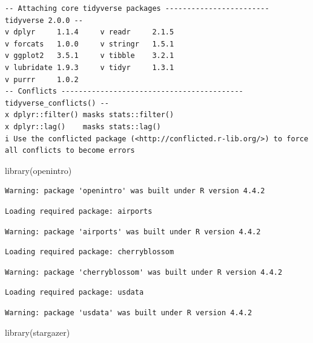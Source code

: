 \documentclass[
  letterpaper,
]{book}
\newenvironment{Shaded}{\begin{snugshade}}{\end{snugshade}}
\newcommand{\FunctionTok}[1]{\textcolor[rgb]{0.28,0.35,0.67}{#1}}
\newcommand{\NormalTok}[1]{\textcolor[rgb]{0.00,0.23,0.31}{#1}}
\begin{document}
\begin{verbatim}
-- Attaching core tidyverse packages ------------------------ tidyverse 2.0.0 --
v dplyr     1.1.4     v readr     2.1.5
v forcats   1.0.0     v stringr   1.5.1
v ggplot2   3.5.1     v tibble    3.2.1
v lubridate 1.9.3     v tidyr     1.3.1
v purrr     1.0.2     
-- Conflicts ------------------------------------------ tidyverse_conflicts() --
x dplyr::filter() masks stats::filter()
x dplyr::lag()    masks stats::lag()
i Use the conflicted package (<http://conflicted.r-lib.org/>) to force all conflicts to become errors
\end{verbatim}

\begin{Shaded}
\begin{Highlighting}[]
\FunctionTok{library}\NormalTok{(openintro)}
\end{Highlighting}
\end{Shaded}

\begin{verbatim}
Warning: package 'openintro' was built under R version 4.4.2
\end{verbatim}

\begin{verbatim}
Loading required package: airports
\end{verbatim}

\begin{verbatim}
Warning: package 'airports' was built under R version 4.4.2
\end{verbatim}

\begin{verbatim}
Loading required package: cherryblossom
\end{verbatim}

\begin{verbatim}
Warning: package 'cherryblossom' was built under R version 4.4.2
\end{verbatim}

\begin{verbatim}
Loading required package: usdata
\end{verbatim}

\begin{verbatim}
Warning: package 'usdata' was built under R version 4.4.2
\end{verbatim}

\begin{Shaded}
\begin{Highlighting}[]
\FunctionTok{library}\NormalTok{(stargazer)}
\end{Highlighting}
\end{Shaded}
\end{document}
